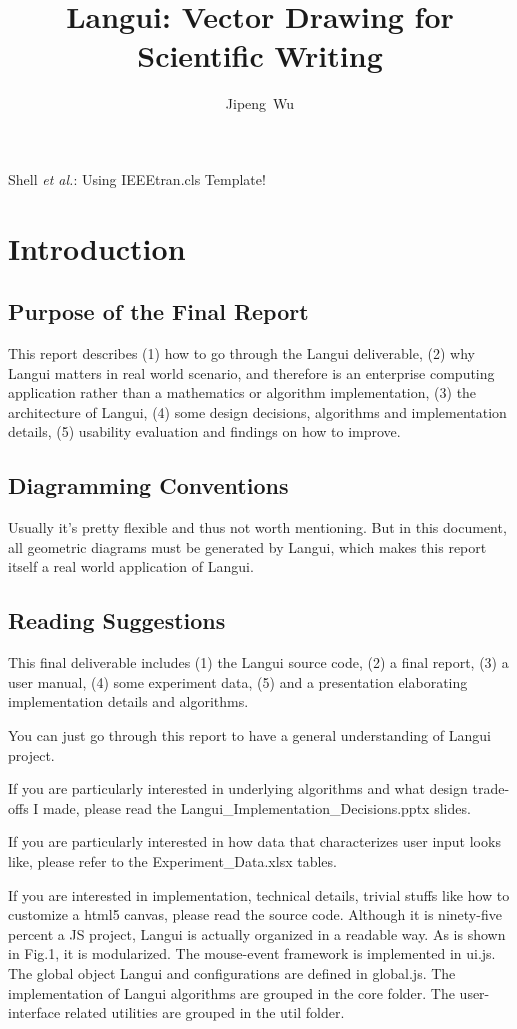 \documentclass[10pt,conference, twocolumn]{IEEEtran}
\begin{document}
\title{Langui: Vector Drawing for Scientific Writing}
\author{Jipeng~Wu}
%
{Shell \MakeLowercase{\textit{et al.}}: Using IEEEtran.cls Template!}
\maketitle

\section{Introduction}
\subsection{Purpose of the Final Report}
This report describes (1) how to go through the Langui deliverable, (2) why Langui matters in real world scenario, and therefore is an enterprise computing application rather than a mathematics or algorithm implementation, (3) the architecture of Langui, (4) some design decisions, algorithms and implementation details, (5) usability evaluation and findings on how to improve. 

\subsection{Diagramming Conventions}
Usually it's pretty flexible and thus not worth mentioning. But in this document, all geometric diagrams must be generated by Langui, which makes this report itself a real world application of Langui.

\subsection{Reading Suggestions}
This final deliverable includes (1) the Langui source code, (2) a final report, (3) a user manual, (4) some experiment data, (5) and a presentation elaborating implementation details and algorithms.

You can just go through this report to have a general understanding of Langui project. 

If you are particularly interested in underlying algorithms and what design trade-offs I made, please read the Langui_Implementation_Decisions.pptx slides.

If you are particularly interested in how data that characterizes user input looks like, please refer to the Experiment_Data.xlsx tables. 

If you are interested in implementation, technical details, trivial stuffs like how to customize a html5 canvas, please read the source code. Although it is ninety-five percent a JS project, Langui is actually organized in a readable way. As is shown in Fig.1, it is modularized. The mouse-event framework is implemented in ui.js. The global object Langui and configurations are defined in global.js. The implementation of Langui algorithms are grouped in the core folder. The user-interface related utilities are grouped in the util folder. 
\end{document}

